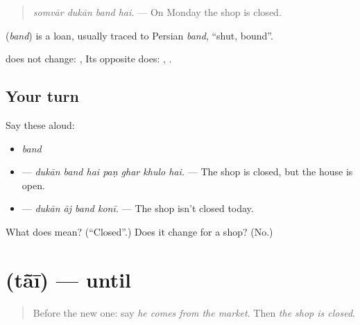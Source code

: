\begin{quote}
\emph{somvār dukān band hai.} — On Monday the shop is closed.
\end{quote}

\begin{cousinweb}
\textbf{} (\emph{band}) is a loan, usually traced to Persian \emph{band}, \textquotedblleft{}shut, bound\textquotedblright{}.
\end{cousinweb}

\begin{grammarlens}[title={What you've built}]
\textbf{} does not change: \textbf{  }, \textbf{  } Its opposite does: \textbf{}, \textbf{}.
\end{grammarlens}

\subsection*{Your turn}
Say these aloud:

\begin{itemize}
\raggedright
  \item \emph{band}
  \item \textbf{      } — \emph{dukān band hai paṇ ghar khulo hai.} — The shop is closed, but the house is open.
  \item \textbf{   } — \emph{dukān āj band konī.} — The shop isn't closed today.
\end{itemize}

\begin{tcolorbox}[breakable,colback=teal!4,colframe=teal!35!black,title={Before you move on}]
What does \textbf{} mean? (\textquotedblleft{}Closed\textquotedblright{}.) Does it change for a shop? (No.)
\end{tcolorbox}
\section[\texorpdfstring{\mw{तांई} (tā̃ī)}{तांई (tā̃ī)}]{ (tā̃ī) — until}

\label{lesson:MW-C164-tai}



\begin{quote}
Before the new one: say \emph{he comes from the market}. Then \emph{the shop is closed}.
\end{quote}

